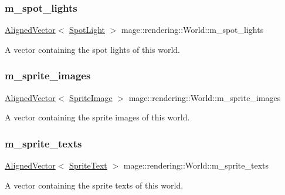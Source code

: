 \subsubsection{\texorpdfstring{m\+\_\+spot\+\_\+lights}{m\_spot\_lights}}
{\footnotesize\ttfamily \mbox{\hyperlink{namespacemage_a8664bfb5ce2179fc64eae9f82c8a5ba8}{Aligned\+Vector}}$<$ \mbox{\hyperlink{classmage_1_1rendering_1_1_spot_light}{Spot\+Light}} $>$ mage\+::rendering\+::\+World\+::m\+\_\+spot\+\_\+lights\hspace{0.3cm}{\ttfamily [private]}}

A vector containing the spot lights of this world. \mbox{\label{classmage_1_1rendering_1_1_world_ae407a779908a300c6c979fd0e11c1471}} 
\subsubsection{\texorpdfstring{m\+\_\+sprite\+\_\+images}{m\_sprite\_images}}
{\footnotesize\ttfamily \mbox{\hyperlink{namespacemage_a8664bfb5ce2179fc64eae9f82c8a5ba8}{Aligned\+Vector}}$<$ \mbox{\hyperlink{classmage_1_1rendering_1_1_sprite_image}{Sprite\+Image}} $>$ mage\+::rendering\+::\+World\+::m\+\_\+sprite\+\_\+images\hspace{0.3cm}{\ttfamily [private]}}

A vector containing the sprite images of this world. \mbox{\label{classmage_1_1rendering_1_1_world_a6d3d85a9a5d13e6ba74d56ace106a865}} 
\subsubsection{\texorpdfstring{m\+\_\+sprite\+\_\+texts}{m\_sprite\_texts}}
{\footnotesize\ttfamily \mbox{\hyperlink{namespacemage_a8664bfb5ce2179fc64eae9f82c8a5ba8}{Aligned\+Vector}}$<$ \mbox{\hyperlink{classmage_1_1rendering_1_1_sprite_text}{Sprite\+Text}} $>$ mage\+::rendering\+::\+World\+::m\+\_\+sprite\+\_\+texts\hspace{0.3cm}{\ttfamily [private]}}

A vector containing the sprite texts of this world. 
